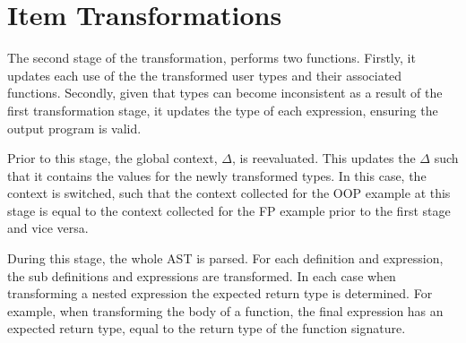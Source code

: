 \documentclass[ oneside,%
                    author={James Elgar},
                    degree={MEng},
                     title={Bidirectional transformer between functional and \\ object-oriented programming in Rust},
                  subtitle={}]{dissertation}
\begin{document}

\section{Item Transformations}
\label{sec:item-trans}

The second stage of the transformation, performs two functions. Firstly, it updates each use of the the transformed user types and their associated functions. Secondly, given that types can become inconsistent as a result of the first transformation stage, it updates the type of each expression, ensuring the output program is valid.


Prior to this stage, the global context, $\Delta$, is reevaluated. This updates the $\Delta$ such that it contains the values for the newly transformed types. In this case, the context is switched, such that the context collected for the OOP example at this stage is equal to the context collected for the FP example prior to the first stage and vice versa.

During this stage, the whole AST is parsed. For each definition and expression, the sub definitions and expressions are transformed. In each case when transforming a nested expression the expected return type is determined. For example, when transforming the body of a function, the final expression has an expected return type, equal to the return type of the function signature. 

\end{document}

